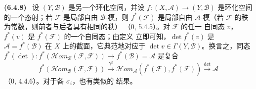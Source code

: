 \documentclass[UTF8,fontset=none,11pt,oneside,openany]{ctexbook}
\newenvironment{env}[1][]{\par\medskip\noindent\textbf{(#1)}\ }{\par}
\newcommand{\egaxref}[2]{\textup{#2}}
\begin{document}
\begin{env}[6.4.8]
设 $(Y,\mathcal{B})$ 是另一个环化空间，并设
$f:(X,\mathcal{A})\to(Y,\mathcal{B})$ 是环化空间的一个态射；若
$\mathcal{F}$ 是局部自由 $\mathcal{B}$-模，则
$f^*(\mathcal{F})$ 是局部自由 $\mathcal{A}$-模（若
$\mathcal{F}$ 的秩为常数，则前者与后者具有相同的秩）
（\egaxref{0.5.4.5-zh}{0, 5.4.5}）。对 $\mathcal{F}$ 的任一
自同态 $v$，$f^*(v)$ 是 $f^*(\mathcal{F})$ 的一个自同态；由定义
立即可知，$\det f^*(v)$ 是 $\mathcal{A}=f^*(\mathcal{B})$ 在 $X$
上的截面，它典范地对应于
$\det v\in\Gamma(Y,\mathcal{B})$。换言之，同态
$f^*(\det):f^*(\mathcal{H}om_{\mathcal{B}}(\mathcal{F},\mathcal{F}))
\to f^*(\mathcal{B})=\mathcal{A}$ 是复合
\[
f^*(\mathcal{H}om_{\mathcal{B}}(\mathcal{F},\mathcal{F}))
\xrightarrow{\gamma^\sharp}
\mathcal{H}om_{\mathcal{A}}(f^*(\mathcal{F}),f^*(\mathcal{F}))
\xrightarrow{\det}\mathcal{A}
\]
（\egaxref{0.4.4.6-zh}{0, 4.4.6}）。对于各 $\sigma_i$，也有类似的
结果。
\end{env}
\end{document}
